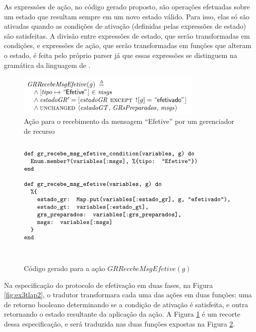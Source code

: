 As expressões de ação, no código gerado proposto, são operações efetuadas sobre
um estado que resultam sempre em um novo estado válido. Para isso, elas só são
ativadas quando as condições de ativação (definidas pelas expressões
de estado) são satisfeitas. A divisão
entre expressões de estado, que serão transformadas em condições, e expressões de
ação, que serão transformadas em funções que alteram o estado, é feita pelo
próprio parser já que essas expressões se distinguem na gramática da linguagem
de \TLAA.

\begin{figure}[h]
  \centering
  \includegraphics[width=0.8\textwidth]{fig/GRRecebeMsgEfetive.png}
  \caption{Ação para o recebimento da mensagem ``Efetive'' por um gerenciador de
  recurso}
  \label{fig:recebe-efetive-tla}
\end{figure}
\begin{figure}[h]
  \centering
  $\progfig{
  def gr\_recebe\_msg\_efetive\_condition(variables, g) do\\
  ~~Enum.member?(variables[:msgs], \%\{tipo: "Efetive"\})\\
  end\\\\

  def gr\_recebe\_msg\_efetive(variables, g) do\\
  ~~\%\{\\
  ~~~~estado\_gr: Map.put(variables[:estado\_gr], g, "efetivado"),\\
  ~~~~estado\_gt: variables[:estado\_gt],\\
  ~~~~grs\_preparados: variables[:grs\_preparados],\\
  ~~~~msgs: variables[:msgs]\\
  ~~\}\\
  end\\
  }$
  \caption{Código gerado para a ação $GRRecebeMsgEfetive(g)$}
\label{fig:recebe-efetive-elixir}
\end{figure}


Na especificação do protocolo de efetivação em duas fases, na Figura
\ref{fig:ex3tlap2}, o tradutor transformara cada uma das ações em duas funções:
uma de retorno booleano determinando se a condição de ativação é satisfeita, e
outra retornando o estado resultante da aplicação da ação. A Figura
\ref{fig:recebe-efetive-tla} é um recorte dessa especificação, e será traduzida
nas duas funções expostas na Figura \ref{fig:recebe-efetive-elixir}.


